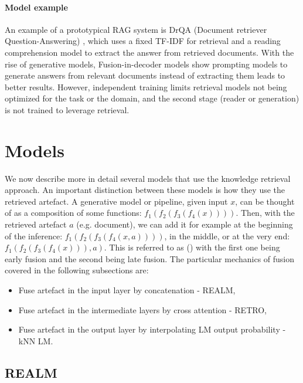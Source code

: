 \paragraph{Model example}
An example of a prototypical RAG system is DrQA (Document retriever Question-Answering) \citep{chen-etal-2017-reading}, which uses a fixed TF-IDF for retrieval and a reading comprehension model to extract the answer from retrieved documents. With the rise of generative models, Fusion-in-decoder models \citep{izacard-grave-2021-leveraging} show prompting models to generate answers from relevant documents instead of extracting them leads to better results.  However, independent training limits retrieval models not being optimized for the task or the domain, and the second stage (reader or generation) is not trained to leverage retrieval. 


\section{Models}
We now describe more in detail several models that use the knowledge retrieval approach.
An important distinction between these models is how they use the retrieved artefact.
A generative model or pipeline, given input $x$, can be thought of as a composition of some functions: $f_1(f_2(f_3(f_4(x))))$.
Then, with the retrieved artefact $a$ (e.g. document), we can add it for example at the beginning of the inference: $f_1(f_2(f_3(f_4(x, a))))$, in the middle, or at the very end: $f_1(f_2(f_3(f_4(x))), a)$.
This is referred to as   () with the first one being early fusion and the second being late fusion.
The particular mechanics of fusion covered in the following subsections are:
\begin{itemize}
    \item Fuse artefact in the input layer by concatenation - REALM,
    \item Fuse artefact in the intermediate layers by cross attention - RETRO,
    \item Fuse artefact in the output layer by interpolating LM output probability - kNN LM.
\end{itemize}

\subsection{REALM}

